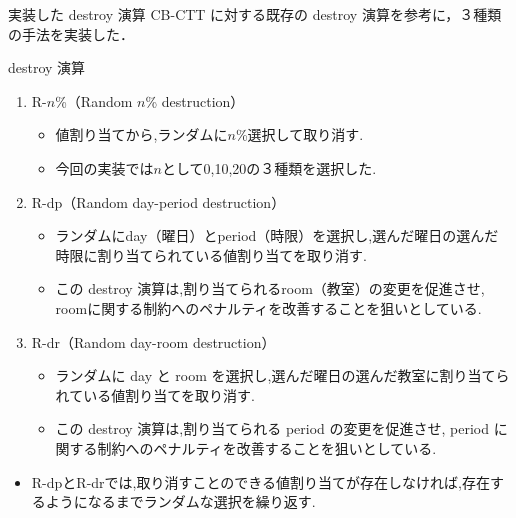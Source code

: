 \documentclass[11pt,dvipdfmx]{beamer}
\begin{document}
\begin{frame}{実装した destroy 演算}
  \small CB-CTT に対する既存の destroy 演算を参考に，３種類の手法を実装した．
  \begin{block}{\small destroy 演算}
  \begin{enumerate}
  \item \small R-$n$\%（Random $n$\% destruction）
  \begin{itemize}
   \item \scriptsize 値割り当てから,ランダムに$n$\%選択して取り消す.
   \item \scriptsize 今回の実装では$n$として0,10,20の３種類を選択した.
  \end{itemize}
  \item \small R-dp（Random day-period destruction）
   \begin{itemize}
    \item \scriptsize ランダムにday（曜日）とperiod（時限）を選択し,選んだ曜日の選んだ時限に割り当てられている値割り当てを取り消す.
    \item \scriptsize この destroy 演算は,割り当てられるroom（教室）の変更を促進させ, roomに関する制約へのペナルティを改善することを狙いとしている.
   \end{itemize}
  \item \small R-dr（Random day-room destruction）
   \begin{itemize}
    \item \scriptsize ランダムに day と room を選択し,選んだ曜日の選んだ教室に割り当てられている値割り当てを取り消す.
    \item \scriptsize この destroy 演算は,割り当てられる period の変更を促進させ, period に関する制約へのペナルティを改善することを狙いとしている.
   \end{itemize}
  \end{enumerate}
  \end{block}
  \begin{itemize}
   \item \small R-dpとR-drでは,取り消すことのできる値割り当てが存在しなければ,存在するようになるまでランダムな選択を繰り返す.
  \end{itemize}
 \end{frame}
\end{document}
